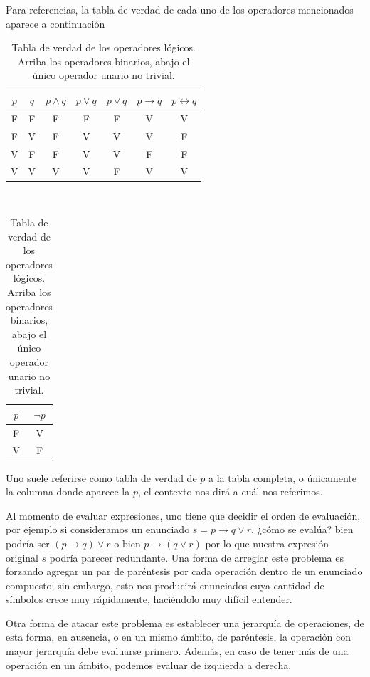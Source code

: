 \documentclass{book}
\theoremstyle{definition}
\begin{document}
Para referencias, la tabla de verdad de cada uno de los operadores mencionados aparece a continuación
\begin{table}[h]
\begin{center}\begin{tabular}{|c|c||c|c|c|c|c|}
	\hline 
	$p$& $q$ & $p \wedge q $ & $p \vee q$  & $p \veebar q $ & $p \rightarrow q$ & $p \leftrightarrow q$  \\
	\hline \hline
	F & F & F & F & F & V & V \\
	\hline
	F & V & F & V & V & V & F \\
	\hline
	V & F & F & V & V & F & F \\
	\hline
	V & V & V & V & F & V & V \\
	\hline
\end{tabular}\\
\begin{tabular}{|c||c|}
	\hline
	$p$ & $\neg p$ \\
	\hline \hline
	F & V \\
	\hline
	V & F \\
	\hline
\end{tabular}
\end{center}
\caption{Tabla de verdad de los operadores lógicos. Arriba los operadores binarios, abajo el único operador unario no trivial.}
\label{tb_tablaVerdadOperadores}
\end{table}

Uno suele referirse como tabla de verdad de $p$ a la tabla completa, o únicamente la columna donde aparece la $p$, el contexto nos dirá a cuál nos referimos.

Al momento de evaluar expresiones, uno tiene que decidir el orden de evaluación, por ejemplo si consideramos un enunciado $s=p\rightarrow q \vee r$, ¿cómo se evalúa? bien podría ser $(p\rightarrow q) \vee r$ o bien $p\rightarrow (q \vee r)$ por lo que nuestra expresión original $s$ podría parecer redundante. Una forma de arreglar este problema es forzando agregar un par de paréntesis por cada operación dentro de un enunciado compuesto; sin embargo, esto nos producirá enunciados cuya cantidad de símbolos crece muy rápidamente, haciéndolo muy difícil entender.

Otra forma de atacar este problema es establecer una jerarquía de operaciones, de esta forma, en ausencia, o en un mismo ámbito, de paréntesis, la operación con mayor jerarquía debe evaluarse primero.
Además, en caso de tener más de una operación en un ámbito, podemos evaluar de izquierda a derecha.
\end{document}
